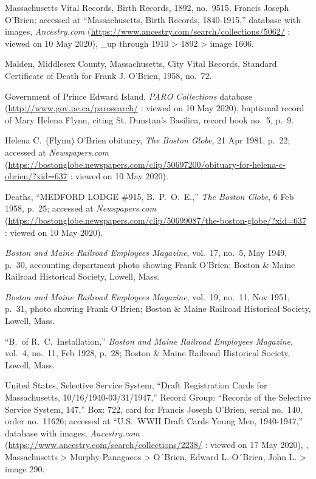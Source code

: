 \begin{thebibliography}{999}
	Massachusetts Vital Records, Birth Records, 1892, no.\ 9515, Francis Joseph O'Brien; accessed at ``Massachusetts, Birth Records, 1840-1915,'' database with images, \textit{Ancestry.com} (\url{https://www.ancestry.com/search/collections/5062/} : viewed on 10 May 2020), \_up through 1910 > 1892 > image 1606.
	
	Malden, Middlesex County, Massachusetts, City Vital Records, Standard Certificate of Death for Frank J. O'Brien, 1958, no.\ 72.
	
	Government of Prince Edward Island, \textit{PARO Collections} database (\url{http://www.gov.pe.ca/parosearch/} : viewed on 10 May 2020), baptismal record of Mary Helena Flynn, citing St. Dunstan's Basilica, record book no.\ 5, p.\ 9.
	
	Helena C.\ (Flynn) O'Brien obituary, \textit{The Boston Globe}, 21 Apr 1981, p.\ 22; accessed at \textit{Newspapers.com} (\url{https://bostonglobe.newspapers.com/clip/50697200/obituary-for-helena-c-obrien/?xid=637} : viewed on 10 May 2020).
	
	Deaths, ``MEDFORD LODGE \#915, B.\ P.\ O.\ E.,'' \textit{The Boston Globe}, 6 Feb 1958, p.\ 25; accessed at \textit{Newspapers.com} (\url{https://bostonglobe.newspapers.com/clip/50699087/the-boston-globe/?xid=637} : viewed on 10 May 2020).
	
	\textit{Boston and Maine Railroad Employees Magazine}, vol.\ 17, no.\ 5, May 1949, p.\ 30, accounting department photo showing Frank O'Brien; Boston \& Maine Railroad Historical Society, Lowell, Mass.
	
	\textit{Boston and Maine Railroad Employees Magazine}, vol.\ 19, no.\ 11, Nov 1951, p.\ 31, photo showing Frank O'Brien; Boston \& Maine Railroad Historical Society, Lowell, Mass.
	
	``B.\ of R.\ C.\ Installation,'' \textit{Boston and Maine Railroad Employees Magazine}, vol.\ 4, no.\ 11, Feb 1928, p.\ 28; Boston \& Maine Railroad Historical Society, Lowell, Mass.
	
	United States, Selective Service System, ``Draft Registration Cards for Massachusetts, 10/16/1940-03/31/1947,'' Record Group: ``Records of the Selective Service System, 147,'' Box: 722, card for Francis Joseph O'Brien, serial no.\ 140, order no.\ 11626; accessed at ``U.S.\ WWII Draft Cards Young Men, 1940-1947,'' database with images, \textit{Ancestry.com} (\url{https://www.ancestry.com/search/collections/2238/} : viewed on 17 May 2020), , Massachusetts > Murphy-Panagacos > O´Brien, Edward L.-O´Brien, John L. > image 290.
	

\end{thebibliography}
